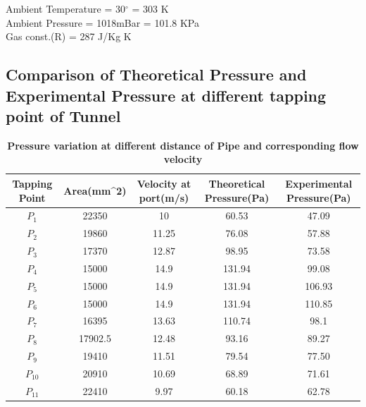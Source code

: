\documentclass[12pt,a4paper]{article}
\begin{document}
Ambient Temperature = 30$^{\circ}$ = 303 K\\
Ambient Pressure = 1018mBar = 101.8 KPa\\
Gas const.(R) = 287 J/Kg K






\subsection{Comparison of Theoretical Pressure and Experimental Pressure at different tapping point of Tunnel}


\begin{table}[ht]
\centering
\caption{\textbf{Pressure variation at different distance of Pipe and corresponding flow velocity}}
\vspace{2mm}
\begin{flushleft}
\begin{tabular}{|c|c|c|c|c|} 
 \hline
Tapping Point & Area(mm^{2}) & Velocity at port(m/s) & Theoretical Pressure(Pa) & Experimental Pressure(Pa) \\ [0.1ex] 
 \hline
$P_1$ & 22350 & 10  &  60.53 & 47.09 \\ 
 \hline
$P_2$ & 19860 & 11.25 & 76.08 & 57.88  \\
 \hline
$P_3$ & 17370 & 12.87 & 98.95 & 73.58  \\
 \hline
$P_4$ & 15000 & 14.9 & 131.94 & 99.08  \\
 \hline
$P_5$ & 15000 & 14.9 & 131.94 & 106.93 \\ 
 \hline
$P_6$ & 15000 & 14.9 & 131.94 & 110.85 \\ 
 \hline
$P_7$ & 16395 & 13.63 & 110.74 & 98.1\\
 \hline
$P_8$ & 17902.5 & 12.48 & 93.16 & 89.27\\
 \hline
$P_9$ & 19410 & 11.51 & 79.54 & 77.50 \\ 
 \hline 
$P_{10}$ & 20910 & 10.69 & 68.89 & 71.61 \\ 
 \hline 
$P_{11}$ & 22410 & 9.97 & 60.18 & 62.78 \\ 
 \hline
 
 
\end{tabular}
\end{flushleft}
\end{table}
\end{document}
